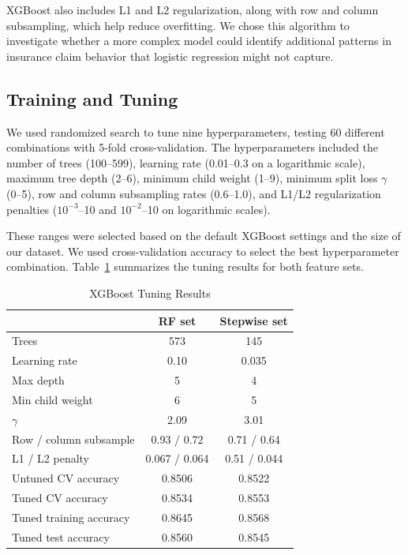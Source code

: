 \documentclass[conference]{IEEEtran}
\begin{document}
XGBoost also includes L1 and L2 regularization, along with row and column subsampling, which help reduce
overfitting. We chose this algorithm to investigate whether a more complex model could identify additional
patterns in insurance claim behavior that logistic regression might not capture.

\subsection{Training and Tuning}

We used randomized search to tune nine hyperparameters, testing 60 different combinations with 5-fold
cross-validation. The hyperparameters included the number of trees (100--599), learning rate
(0.01--0.3 on a logarithmic scale), maximum tree depth (2--6), minimum child weight (1--9), minimum split
loss $\gamma$ (0--5), row and column subsampling rates (0.6--1.0), and L1/L2 regularization penalties
($10^{-3}$--10 and $10^{-2}$--10 on logarithmic scales).

These ranges were selected based on the default XGBoost settings and the size of our dataset. We used
cross-validation accuracy to select the best hyperparameter combination. Table~\ref{tab:xgb_tuning}
summarizes the tuning results for both feature sets.

\begin{table}[t]
\caption{XGBoost Tuning Results}
\label{tab:xgb_tuning}
\centering
\begin{tabular}{@{}lcc@{}}
\toprule
 & \textbf{RF set} & \textbf{Stepwise set} \\
\midrule
Trees & 573 & 145 \\
Learning rate & 0.10 & 0.035 \\
Max depth & 5 & 4 \\
Min child weight & 6 & 5 \\
$\gamma$ & 2.09 & 3.01 \\
Row / column subsample & 0.93 / 0.72 & 0.71 / 0.64 \\
L1 / L2 penalty & 0.067 / 0.064 & 0.51 / 0.044 \\
\midrule
Untuned CV accuracy & 0.8506 & 0.8522 \\
Tuned CV accuracy & 0.8534 & 0.8553 \\
Tuned training accuracy & 0.8645 & 0.8568 \\
Tuned test accuracy & 0.8560 & 0.8545 \\
\bottomrule
\end{tabular}
\end{table}
\end{document}
